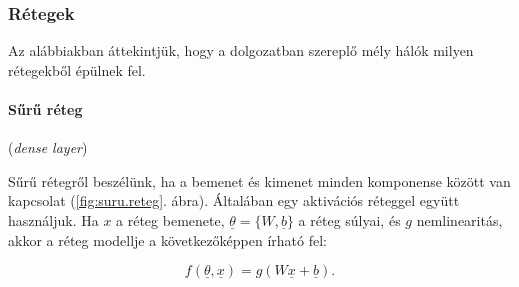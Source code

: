 

\subsubsection{Rétegek}



Az alábbiakban áttekintjük, hogy a dolgozatban szereplő mély hálók milyen rétegekből épülnek fel.


\paragraph{Sűrű réteg} (\textit{dense layer}) 


Sűrű rétegről beszélünk, ha a bemenet és kimenet minden komponense között van kapcsolat (\ref{fig:suru.reteg}. ábra). Általában egy aktivációs réteggel együtt használjuk. Ha $ x $ a réteg bemenete, $ \underline{\theta} = \{W, \underline{b}\} $ a réteg súlyai, és $ g $ nemlinearitás, akkor a réteg modellje a következőképpen írható fel:


\[  
f(\underline{\theta}, \underline{x}) = g(W \underline{x} + \underline{b}) .
\]


